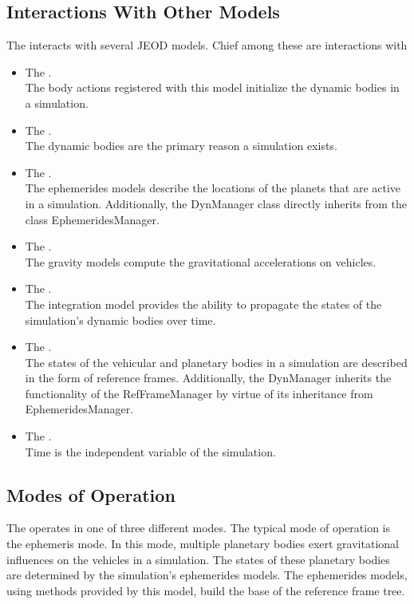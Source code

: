 \subsection{Interactions With Other Models}
The \ModelDesc interacts with several JEOD models. Chief among these
are interactions with\begin{itemize}
\item The . \\
The body actions registered with this model initialize the dynamic bodies
in a simulation.
\item The . \\
The dynamic bodies are the primary reason a simulation exists.
\item The . \\
The ephemerides models describe the locations of the planets
that are active in a simulation. Additionally, the DynManager
class directly inherits from the class EphemeridesManager.
\item The . \\
The gravity models compute the gravitational accelerations on
vehicles.
\item The . \\
The integration model provides the ability to propagate the states
of the simulation's dynamic bodies over time.
\item The . \\
The states of the vehicular and planetary bodies in a simulation
are described in the form of reference frames. Additionally,
the DynManager inherits the functionality of the
RefFrameManager by virtue of its inheritance from EphemeridesManager.
\item The . \\
Time is the independent variable of the simulation.
\end{itemize}

\subsection{Modes of Operation}
The \ModelDesc operates in one of three different modes. The typical mode of
operation is the ephemeris mode. In this mode, multiple planetary bodies
exert gravitational influences on the vehicles in a simulation.
The states of these planetary bodies are determined by the simulation's
ephemerides models. The ephemerides models, using methods provided by this
model, build the base of the reference frame tree.

